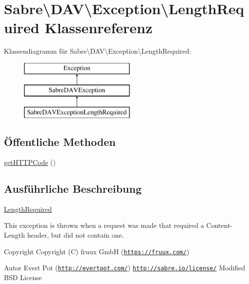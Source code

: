 \hypertarget{class_sabre_1_1_d_a_v_1_1_exception_1_1_length_required}{}\section{Sabre\textbackslash{}D\+AV\textbackslash{}Exception\textbackslash{}Length\+Required Klassenreferenz}
\label{class_sabre_1_1_d_a_v_1_1_exception_1_1_length_required}
Klassendiagramm für Sabre\textbackslash{}D\+AV\textbackslash{}Exception\textbackslash{}Length\+Required\+:\begin{figure}[H]
\begin{center}
\leavevmode
\includegraphics[height=3.000000cm]{class_sabre_1_1_d_a_v_1_1_exception_1_1_length_required}
\end{center}
\end{figure}
\subsection*{Öffentliche Methoden}
\begin{DoxyCompactItemize}
\item 
\mbox{\hyperlink{class_sabre_1_1_d_a_v_1_1_exception_1_1_length_required_af9c272ad868428c14177e5076405adce}{get\+H\+T\+T\+P\+Code}} ()
\end{DoxyCompactItemize}


\subsection{Ausführliche Beschreibung}
\mbox{\hyperlink{class_sabre_1_1_d_a_v_1_1_exception_1_1_length_required}{Length\+Required}}

This exception is thrown when a request was made that required a Content-\/\+Length header, but did not contain one.

\begin{DoxyCopyright}{Copyright}
Copyright (C) fruux GmbH (\href{https://fruux.com/}{\tt https\+://fruux.\+com/}) 
\end{DoxyCopyright}
\begin{DoxyAuthor}{Autor}
Evert Pot (\href{http://evertpot.com/}{\tt http\+://evertpot.\+com/})  \href{http://sabre.io/license/}{\tt http\+://sabre.\+io/license/} Modified B\+SD License 
\end{DoxyAuthor}


